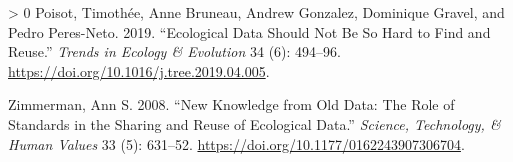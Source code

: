 \documentclass[10pt,oneside]{article}
\newlength{\cslhangindent}
\newenvironment{CSLReferences}[3] %
 {%
  \setlength{\parindent}{0pt}
  \ifodd #1 \everypar{\setlength{\hangindent}{\cslhangindent}}\ignorespaces\fi
  \ifnum #2 > 0
  \setlength{\parskip}{#2\baselineskip}
  \fi
 }%
 {}
\begin{document}
\begin{CSLReferences}{1}{0}
\leavevmode\hypertarget{ref-Poisot2019EcoDat}{}%
Poisot, Timothée, Anne Bruneau, Andrew Gonzalez, Dominique Gravel, and
Pedro Peres-Neto. 2019. {``Ecological Data Should Not Be So Hard to Find
and Reuse.''} \emph{Trends in Ecology \& Evolution} 34 (6): 494--96.
\url{https://doi.org/10.1016/j.tree.2019.04.005}.

\leavevmode\hypertarget{ref-Zimmerman2008NewKno}{}%
Zimmerman, Ann S. 2008. {``New Knowledge from Old Data: The Role of
Standards in the Sharing and Reuse of Ecological Data.''} \emph{Science,
Technology, \& Human Values} 33 (5): 631--52.
\url{https://doi.org/10.1177/0162243907306704}.

\end{CSLReferences}
\end{document}
